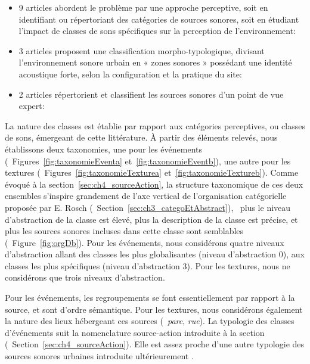 \begin{itemize}
\item 9 articles abordent le problème par une approche perceptive, soit en identifiant ou répertoriant des catégories de sources sonores, soit en étudiant l'impact de classes de sons spécifiques sur la perception de l'environnement: \cite{maffiolo_caracterisation_1999,raimbault2002simulation,guastavino_etude_2003,defreville2004aactivity,raimbault2005urban,dubois2006cognitive,devergie_relations_2006,guastavino2006ideal,niessen2010categories}
\item 3 articles proposent une classification morpho-typologique, divisant l’environnement sonore urbain en « zones sonores » possédant une identité acoustique forte, selon la configuration et la pratique du site: \cite{maffiolo_caracterisation_1999,beaumont2004pertinence,polack2008perceptive}
\item 2 articles répertorient et classifient les sources sonores d’un point de vue expert: \cite{leobon_analyse_1986,brown2011towards}
\end{itemize}

La nature des classes est établie par rapport aux catégories perceptives, ou classes de sons, émergeant de cette littérature. À partir des éléments relevés, nous établissons deux taxonomies, une pour les événements (\cf~Figures~\ref{fig:taxonomieEventa} et~\ref{fig:taxonomieEventb}), une autre pour les textures (\cf~Figures~\ref{fig:taxonomieTexturea} et~\ref{fig:taxonomieTextureb}). Comme évoqué à la section~\ref{sec:ch4_sourceAction}, la structure taxonomique de ces deux ensembles s'inspire grandement de l'axe vertical de l'organisation catégorielle proposée par E. Rosch (\cf~Section~\ref{sec:ch3_categoEtAbstract}), \ie~plus le niveau d'abstraction de la classe est élevé, plus la description de la classe est précise, et plus les sources sonores incluses dans cette classe sont semblables (\cf~Figure~\ref{fig:orgDb}). Pour les événements, nous considérons quatre niveaux d'abstraction allant des classes les plus globalisantes (niveau d'abstraction 0), aux classes les plus spécifiques (niveau d'abstraction 3). Pour les textures, nous ne considérons que trois niveaux d'abstraction.

Pour les événements, les regroupements se font essentiellement par rapport à la source, et sont d’ordre sémantique. Pour les textures, nous considérons également la nature des lieux hébergeant ces sources (\eg~\emph{parc}, \emph{rue}). La typologie des classes d'événements suit la nomenclature source-action introduite à la section (\cf~Section~\ref{sec:ch4_sourceAction}). Elle est assez proche d'une autre typologie des sources sonores urbaines introduite ultérieurement \citep{Salamon14}.

